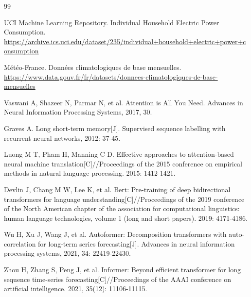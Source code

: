 \documentclass[12pt,a4paper]{ctexart}
\begin{document}
\begin{thebibliography}{99}

UCI Machine Learning Repository. Individual Household Electric Power Consumption.
\url{https://archive.ics.uci.edu/dataset/235/individual+household+electric+power+consumption}

M\'et\'eo-France. Donn\'ees climatologiques de base mensuelles.
\url{https://www.data.gouv.fr/fr/datasets/donnees-climatologiques-de-base-mensuelles}

Vaswani A, Shazeer N, Parmar N, et al. Attention is All You Need.
Advances in Neural Information Processing Systems, 2017, 30.

Graves A. Long short-term memory[J]. Supervised sequence labelling with recurrent neural networks, 2012: 37-45.

Luong M T, Pham H, Manning C D. Effective approaches to attention-based neural machine translation[C]//Proceedings of the 2015 conference on empirical methods in natural language processing. 2015: 1412-1421.

Devlin J, Chang M W, Lee K, et al. Bert: Pre-training of deep bidirectional transformers for language understanding[C]//Proceedings of the 2019 conference of the North American chapter of the association for computational linguistics: human language technologies, volume 1 (long and short papers). 2019: 4171-4186.

Wu H, Xu J, Wang J, et al. Autoformer: Decomposition transformers with auto-correlation for long-term series forecasting[J]. Advances in neural information processing systems, 2021, 34: 22419-22430.

Zhou H, Zhang S, Peng J, et al. Informer: Beyond efficient transformer for long sequence time-series forecasting[C]//Proceedings of the AAAI conference on artificial intelligence. 2021, 35(12): 11106-11115.

\end{thebibliography}
\end{document}
